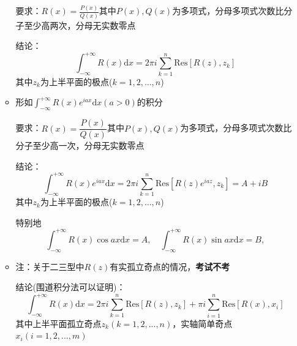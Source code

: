 \documentclass[a4paper,11pt,UTF8]{article}
\begin{document}
\begin{enumerate}
\begin{itemize}
		要求：$R(x)=\frac{P(x)}{Q(x)}$其中$P(x),Q(x)$为多项式，分母多项式次数比分子至少高两次，分母无实数零点
		
		结论：
		$$
		\displaystyle\int_{-\infty}^{+\infty}R(x)\mathrm{d}x=2\pi i\sum_{k=1}^n\mathrm{Res}[R(z),z_k]
		$$
		其中$z_k$为上半平面的极点($k=1,2,\ldots,n$)
		\item 形如$\displaystyle\int_{-\infty}^{+\infty}R(x)e^{iax}\mathrm{d}x(a>0)$的积分
		
		要求：$R(x)=\dfrac{P(x)}{Q(x)}$其中$P(x),Q(x)$为多项式，分母多项式次数比分子至少高一次，分母无实数零点
		
		结论：
		$$
		\displaystyle\int_{-\infty}^{+\infty}R(x)e^{iax}\mathrm{d}x=2\pi i\sum_{k=1}^n\mathrm{Res}[R(z)e^{iaz},z_k]=A+iB
		$$
		其中$z_k$为上半平面的极点($k=1,2,\ldots,n$)
		
		特别地
		$$
		\int_{-\infty}^{+\infty}R(x)\cos ax\mathrm{d}x=A,\quad \int_{-\infty}^{+\infty}R(x)\sin ax\mathrm{d}x=B,
		$$
		\item 注：关于二三型中$R(z)$有实孤立奇点的情况，\textbf{考试不考}
		
		结论(围道积分法可以证明)：
		$$
		\displaystyle\int_{-\infty}^{+\infty}R(x)\mathrm{d}x=2\pi i\sum_{k=1}^n\mathrm{Res}[R(z),z_k]+\pi  i\sum_{i=1}^n\mathrm{Res}[R(x),x_i]
		$$
		其中上半平面孤立奇点$z_k(k=1,2,...,n)$，实轴简单奇点$x_i(i=1,2,...,m)$
	\end{itemize}
	
	
\end{enumerate}
\end{document}
